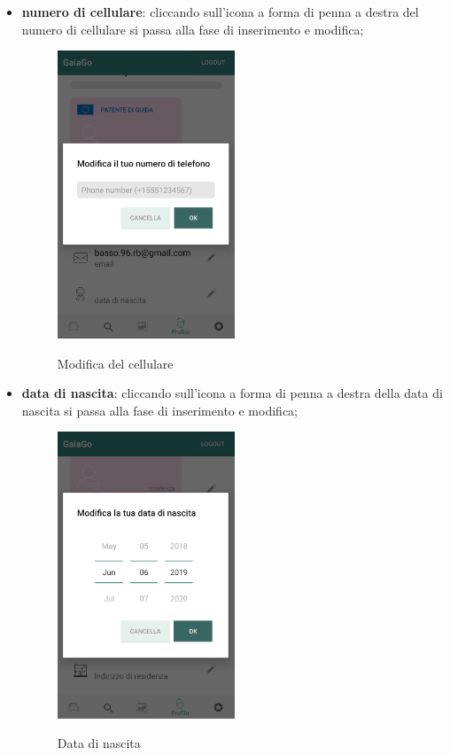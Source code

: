 \begin{itemize}
		\item \textbf{numero di cellulare}: cliccando sull'icona a forma di penna a destra del numero di cellulare si passa alla fase di inserimento e modifica;
	\begin{figure}[H] 
		\centering 
		\includegraphics[width=0.5\textwidth]{res/images/modifica_cellulare.png}\\
		\caption{Modifica del cellulare}
		\label{modificell}
	\end{figure}
\pagebreak

\item \textbf{data di nascita}: cliccando sull'icona a forma di penna a destra della data di nascita si passa alla fase di inserimento e modifica;
\begin{figure}[H] 
	\centering 
	\includegraphics[width=0.5\textwidth]{res/images/modifica_data_nascita.png}\\
	\caption{Data di nascita}
	\label{modificanascita}
\end{figure}
\pagebreak


\end{itemize}
